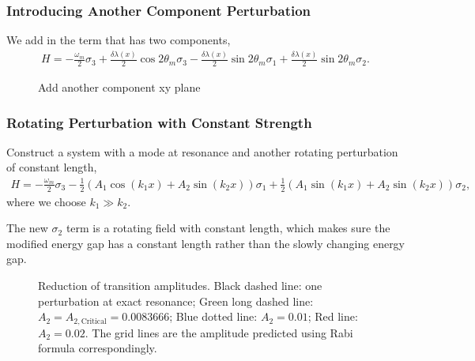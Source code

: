 \documentclass[letterpaper,12pt,english]{sphinxmanual}
\begin{document}
\subsubsection{Introducing Another Component Perturbation}
\label{\detokenize{matter-stimulated/picture:introducing-another-component-perturbation}}
We add in the term that has two components,
\begin{equation*}
\begin{split}H = - \frac{\omega_m}{2} \sigma_3 + \frac{\delta \lambda(x)}{2} \cos 2\theta_m \sigma_3 - \frac{\delta \lambda(x)}{2} \sin 2\theta_m \sigma_1 + \frac{\delta \lambda(x)}{2} \sin 2\theta_m \sigma_2.\end{split}
\end{equation*}\begin{figure}[htbp]
\centering
\capstart

\noindent{}
\caption{Add another component xy plane}\label{\detokenize{matter-stimulated/picture:id12}}\end{figure}


\subsubsection{Rotating Perturbation with Constant Strength}
\label{\detokenize{matter-stimulated/picture:rotating-perturbation-with-constant-strength}}
Construct a system with a mode at resonance and another rotating perturbation of constant length,
\begin{equation*}
\begin{split}H = - \frac{\omega_m}{2} \sigma_3 - \frac{1}{2} (A_1\cos(k_1x) + A_2 \sin(k_2x))  \sigma_1 + \frac{1}{2} ( A_1\sin (k_1 x) + A_2 \sin(k_2 x) ) \sigma_2,\end{split}
\end{equation*}
where we choose \(k_1\gg k_2\).

The new \(\sigma_2\) term is a rotating field with constant length, which makes sure the modified energy gap has a constant length rather than the slowly changing energy gap.
\begin{figure}[htbp]
\centering
\capstart

\noindent{}
\caption{Reduction of transition amplitudes. Black dashed line: one perturbation at exact resonance; Green long dashed line: \(A_2=A_{2,\mathrm{Critical}}=0.0083666\); Blue dotted line: \(A_2=0.01\); Red line: \(A_2=0.02\). The grid lines are the amplitude predicted using Rabi formula correspondingly.}\label{\detokenize{matter-stimulated/picture:id13}}\end{figure}
\end{document}
